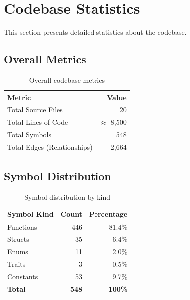 
\section{Codebase Statistics}
\label{sec:statistics}

This section presents detailed statistics about the \ctx{} codebase.

\subsection{Overall Metrics}

\begin{table}[h]
\centering
\begin{tabular}{lr}
\toprule
\textbf{Metric} & \textbf{Value} \\
\midrule
Total Source Files & 20 \\
Total Lines of Code & $\approx$ 8,500 \\
Total Symbols & 548 \\
Total Edges (Relationships) & 2,664 \\
\bottomrule
\end{tabular}
\caption{Overall codebase metrics}
\label{tab:overall-metrics}
\end{table}

\subsection{Symbol Distribution}

\begin{table}[h]
\centering
\begin{tabular}{lrr}
\toprule
\textbf{Symbol Kind} & \textbf{Count} & \textbf{Percentage} \\
\midrule
Functions & 446 & 81.4\% \\
Structs & 35 & 6.4\% \\
Enums & 11 & 2.0\% \\
Traits & 3 & 0.5\% \\
Constants & 53 & 9.7\% \\
\midrule
\textbf{Total} & \textbf{548} & \textbf{100\%} \\
\bottomrule
\end{tabular}
\caption{Symbol distribution by kind}
\label{tab:symbol-distribution}
\end{table}

